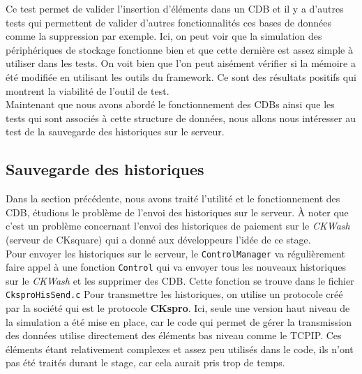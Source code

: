\documentclass[a4paper]{article}
\begin{document}
Ce test permet de valider l'insertion d'éléments dans un CDB et il y a d'autres
tests qui permettent de valider d'autres fonctionnalités ces bases de données
comme la suppression par exemple. Ici, on peut voir que la simulation des
périphériques de stockage fonctionne bien et que cette dernière est assez simple
à utiliser dans les tests. On voit bien que l'on peut aisément vérifier si la
mémoire a été modifiée en utilisant les outils du framework. Ce sont des
résultats positifs qui montrent la viabilité de l'outil de test.\\

Maintenant que nous avons abordé le fonctionnement des CDBs ainsi que les tests
qui sont associés à cette structure de données, nous allons nous intéresser au
test de la sauvegarde des historiques sur le serveur.

\subsection{Sauvegarde des historiques}
\label{savehist}

Dans la section précédente, nous avons traité l'utilité et le fonctionnement des
CDB, étudions le problème de l'envoi des historiques sur le serveur. À noter que
c'est un problème  concernant l'envoi des historiques de paiement sur le
\textit{CKWash} (serveur de CKsquare) qui a donné aux développeurs l'idée de ce
stage.\\

Pour envoyer les historiques sur le serveur, le \verb|ControlManager| va
régulièrement faire appel à une fonction \verb|Control| qui va envoyer tous les nouveaux
historiques sur le \textit{CKWash} et les supprimer des CDB. Cette
fonction se trouve dans le fichier \verb|CksproHisSend.c| Pour transmettre les
historiques, on utilise un protocole créé par la société qui est le protocole
\textbf{CKspro}. Ici, seule une version haut niveau de la simulation a été mise
en place, car le code qui permet de gérer la transmission des données utilise
directement des éléments bas niveau comme le TCPIP. Ces éléments étant
relativement complexes et assez peu utilisés dans le code, ils n'ont pas été
traités durant le stage, car cela aurait pris trop de temps.
\end{document}
